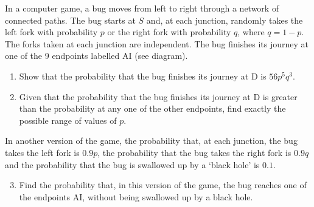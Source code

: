 \begin{problem}
    In a computer game, a bug moves from left to right through a network of connected paths. The bug starts at $S$ and, at each junction, randomly takes the left fork with probability $p$ or the right fork with probability $q$, where $q = 1-p$. The forks taken at each junction are independent. The bug finishes its journey at one of the 9 endpoints labelled A{\textendash}I (see diagram).

    \begin{enumerate}
        \item Show that the probability that the bug finishes its journey at D is $56p^5 q^3$.
        \item Given that the probability that the bug finishes its journey at D is greater than the probability at any one of the other endpoints, find exactly the possible range of values of $p$.
    \end{enumerate}

    In another version of the game, the probability that, at each junction, the bug takes the left fork is $0.9p$, the probability that the bug takes the right fork is $0.9q$ and the probability that the bug is swallowed up by a `black hole' is $0.1$.

    \begin{enumerate}
        \setcounter{enumi}{2}
        \item Find the probability that, in this version of the game, the bug reaches one of the endpoints A{\textendash}I, without being swallowed up by a black hole.
    \end{enumerate}
\end{problem}
